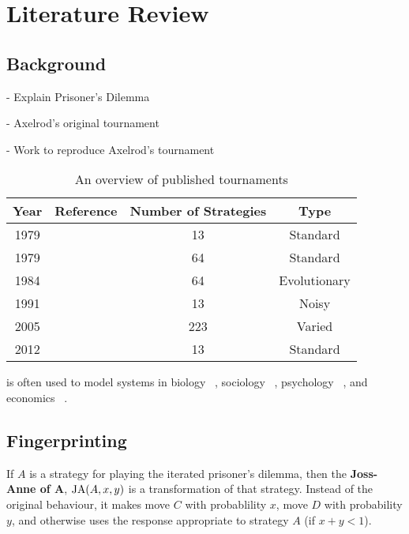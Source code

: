 
\chapter{Literature Review}\label{cha:literature_review}

\section{Background}

- Explain Prisoner's Dilemma

- Axelrod's original tournament

- Work to reproduce Axelrod's tournament ~\cite{Knight2016}

\begin{table}[htbp]
\centering
\begin{tabular}{c c c c}
Year & Reference & Number of Strategies & Type\\
\hline
1979 & & 13 & Standard\\
1979 & & 64 & Standard\\
1984 & & 64 & Evolutionary\\
1991 & & 13 & Noisy\\
2005 & & 223 & Varied\\
2012 & & 13 & Standard\\
\hline
\end{tabular}
\label{tab:tournament_refs}
\caption{An overview of published tournaments}
\end{table}

is often used to model systems in biology ~\cite{Sigmund1999}, sociology ~\cite{Franken2005},
psychology ~\cite{Ishibuchi2005}, and economics ~\cite{Chong2005}.


\section{Fingerprinting}\label{sec:fingerprinting}

\begin{definition}\label{def:joss-ann}
If $A$ is a strategy for playing the iterated prisoner's dilemma, then the \textbf{Joss-Anne of A}, $\text{JA}(A, x, y)$ is a transformation of that strategy.
Instead of the original behaviour, it makes move $C$ with probablility $x$, move $D$ with probability $y$, and otherwise uses the response appropriate to strategy $A$ (if $x+y < 1$).
\end{definition}

